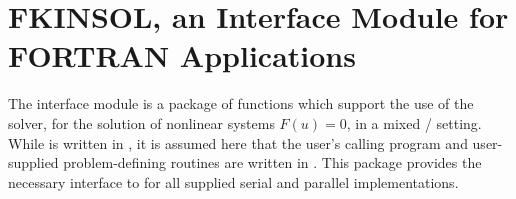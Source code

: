 \chapter{FKINSOL, an Interface Module for FORTRAN Applications}\label{s:fcmix}

The {\fkinsol} interface module is a package of {\C} functions which support
the use of the {\kinsol} solver, for the solution of nonlinear systems
$F(u)=0$, in a mixed {\F}/{\C} setting.  While {\kinsol} is written
in {\C}, it is assumed here that the user's calling program and
user-supplied problem-defining routines are written in {\F}.
This package provides the necessary interface to {\kinsol} for all supplied
serial and parallel {\nvector} implementations.





